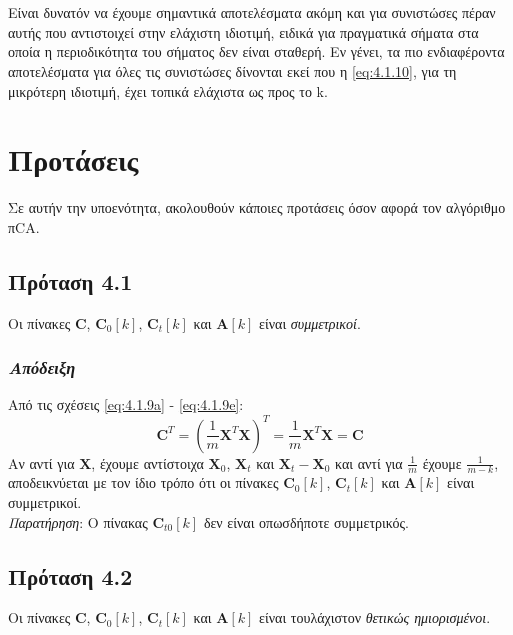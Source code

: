 \\ \\
Είναι δυνατόν να έχουμε σημαντικά αποτελέσματα ακόμη και για συνιστώσες πέραν αυτής που αντιστοιχεί στην ελάχιστη ιδιοτιμή, ειδικά για πραγματικά σήματα στα οποία η περιοδικότητα του σήματος δεν είναι σταθερή. Εν γένει, τα πιο ενδιαφέροντα αποτελέσματα για όλες τις συνιστώσες δίνονται εκεί που η \eqref{eq:4.1.10}, για τη μικρότερη ιδιοτιμή, έχει τοπικά ελάχιστα ως προς το k.
\section{Προτάσεις}
\justifying
Σε αυτήν την υποενότητα, ακολουθούν κάποιες προτάσεις όσον αφορά τον αλγόριθμο πCA.
\subsection*{\small{Πρόταση 4.1}}
Οι πίνακες $\mathbf{C}$, $\mathbf{C}_0[k]$, $\mathbf{C}_t[k]$ και $\mathbf{A}[k]$ είναι \emph{συμμετρικοί}.
\subsubsection*{\small{\textit{Απόδειξη}}}
Από τις σχέσεις \eqref{eq:4.1.9a} - \eqref{eq:4.1.9e}:
$$
\mathbf{C}^T = \left ( \frac{1}{m} \mathbf{X}^T \mathbf{X} \right)^T 
    = \frac{1}{m} \mathbf{X}^T \mathbf{X} = \mathbf{C}
$$
Αν αντί για $\mathbf{X}$, έχουμε αντίστοιχα $\mathbf{X}_0$, $\mathbf{X}_t$ και $\mathbf{X}_t - \mathbf{X}_0$ και αντί για $\frac{1}{m}$ έχουμε $\frac{1}{m-k}$, αποδεικνύεται με τον ίδιο τρόπο ότι οι πίνακες $\mathbf{C}_0[k]$, $\mathbf{C}_t[k]$ και $\mathbf{A}[k]$ είναι συμμετρικοί. 
\\[0.5 \baselineskip]
\textit{Παρατήρηση}: Ο πίνακας $\mathbf{C}_{t0}[k]$ δεν είναι οπωσδήποτε συμμετρικός.
\subsection*{\small{Πρόταση 4.2}}
Οι πίνακες $\mathbf{C}$, $\mathbf{C}_0[k]$, $\mathbf{C}_t[k]$ και $\mathbf{A}[k]$ είναι τουλάχιστον \emph{θετικώς ημιορισμένοι}.
